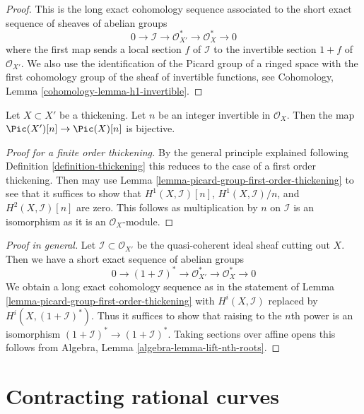 \begin{proof}
This is the long exact cohomology sequence associated to the
short exact sequence of sheaves of abelian groups
$$
0 \to \mathcal{I} \to \mathcal{O}_{X'}^* \to \mathcal{O}_X^* \to 0
$$
where the first map sends a local section $f$ of $\mathcal{I}$
to the invertible section $1 + f$ of $\mathcal{O}_{X'}$.
We also use the identification of the Picard group of a
ringed space with the first cohomology group of the sheaf
of invertible functions, see
Cohomology, Lemma \ref{cohomology-lemma-h1-invertible}.
\end{proof}

\begin{lemma}
\label{lemma-torsion-pic-thickening}
Let $X \subset X'$ be a thickening. Let $n$ be an integer
invertible in $\mathcal{O}_X$. Then the map
$\Pic(X')[n] \to \Pic(X)[n]$ is bijective.
\end{lemma}

\begin{proof}[Proof for a finite order thickening]
By the general principle explained following
Definition \ref{definition-thickening}
this reduces to the case of a first order thickening.
Then may use Lemma \ref{lemma-picard-group-first-order-thickening}
to see that it suffices to show that
$H^1(X, \mathcal{I})[n]$, $H^1(X, \mathcal{I})/n$, and
$H^2(X, \mathcal{I})[n]$ are zero.
This follows as multiplication by $n$ on $\mathcal{I}$
is an isomorphism as it is an $\mathcal{O}_X$-module.
\end{proof}

\begin{proof}[Proof in general]
Let $\mathcal{I} \subset \mathcal{O}_{X'}$ be the quasi-coherent ideal
sheaf cutting out $X$. Then we have a short exact sequence of
abelian groups
$$
0 \to (1 + \mathcal{I})^* \to \mathcal{O}_{X'}^* \to \mathcal{O}_X^* \to 0
$$
We obtain a long exact cohomology sequence as in the statement of
Lemma \ref{lemma-picard-group-first-order-thickening}
with $H^i(X, \mathcal{I})$ replaced by $H^i(X, (1 + \mathcal{I})^*)$.
Thus it suffices to show that raising to the $n$th power is an
isomorphism $(1 + \mathcal{I})^* \to (1 + \mathcal{I})^*$.
Taking sections over affine opens this follows from
Algebra, Lemma \ref{algebra-lemma-lift-nth-roots}.
\end{proof}








\section{Contracting rational curves}
\label{section-contracting}


